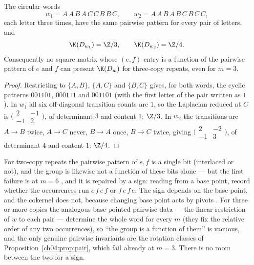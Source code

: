 \begin{proposition}\label{ch04:prop:pair}
The circular words
\[
w_1=A\,A\,B\,A\,C\,C\,B\,B\,C,\qquad w_2=A\,A\,B\,A\,B\,C\,B\,C\,C,
\]
each letter three times, have the same pairwise pattern for every pair of letters, and
\[
\K(D_{w_1})=\Z/3,\qquad \K(D_{w_2})=\Z/4 .
\]
Consequently no square matrix whose $(e,f)$ entry is a function of the pairwise pattern
of $e$ and $f$ can present $\K(D_w)$ for three-copy repeats, even for $m=3$.
\end{proposition}

\begin{proof}
Restricting to $\{A,B\}$, $\{A,C\}$ and $\{B,C\}$ gives, for both words, the cyclic
patterns $001101$, $000111$ and $001101$ (with the first letter of the pair written as
$1$). In $w_1$ all six off-diagonal transition counts are $1$, so the Laplacian reduced
at $C$ is $\bigl(\begin{smallmatrix}2&-1\\-1&2\end{smallmatrix}\bigr)$, of determinant
$3$ and content $1$: $\Z/3$. In $w_2$ the transitions are $A\to B$ twice, $A\to C$
never, $B\to A$ once, $B\to C$ twice, giving
$\bigl(\begin{smallmatrix}2&-2\\-1&3\end{smallmatrix}\bigr)$, of determinant $4$ and
content $1$: $\Z/4$.
\end{proof}

\begin{remark}\label{ch04:rem:sharper}
For two-copy repeats the pairwise pattern of $e,f$ is a single bit (interlaced or not),
and the group is likewise not a function of these bits alone --- but the first failure
is at $m=6$ \cite[Rem.~6.7]{MMN}, and it is repaired by a sign: reading from a base
point, record whether the occurrences run $e\,f\,e\,f$ or $f\,e\,f\,e$. The sign depends
on the base point, and the cokernel does not, because changing base point acts by
pivots \cite[Lem.~4.8]{MMN}. For three or more copies the analogous base-pointed pairwise
data --- the linear restriction of $w$ to each pair --- determine the whole word for
every $m$ (they fix the relative order of any two occurrences), so ``the group is a
function of them'' is vacuous, and the only genuine pairwise invariants are the rotation
classes of Proposition~\ref{ch04:prop:pair}, which fail already at $m=3$. There is no room
between the two for a sign.
\end{remark}

